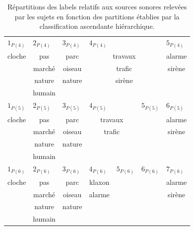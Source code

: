 \begin{table}[t]
\begin{tabular}{c|c|c|c|c|c|c}
\hline
\multicolumn{1}{l|}{$1_{P(4)}$} & \multicolumn{1}{l|}{$2_{P(4)}$} & \multicolumn{1}{l|}{$3_{P(4)}$}  & \multicolumn{3}{l|}{$4_{P(4)}$} & \multicolumn{1}{l}{$5_{P(4)}$} \\
cloche         & pas      & parc    & \multicolumn{3}{c|}{travaux} & alarme\\
               & marché   & oiseau  & \multicolumn{3}{c|}{trafic}  & sirène\\
               & nature   & nature  & \multicolumn{3}{c|}{sirène}  & \\
               & humain   &         & \multicolumn{3}{c|}{}        & \\
\hline
\multicolumn{1}{l|}{$1_{P(5)}$} & \multicolumn{1}{l|}{$2_{P(5)}$} & \multicolumn{1}{l|}{$3_{P(5)}$}  & \multicolumn{2}{l|}{$4_{P(5)}$} & \multicolumn{1}{l|}{$5_{P(5)}$} & \multicolumn{1}{l}{$6_{P(5)}$}\\ 
cloche          & pas      & parc    & \multicolumn{2}{c|}{travaux}     &     & alarme\\     
                & marché   & oiseau  & \multicolumn{2}{c|}{trafic}      &     & sirène\\  
                & nature   & nature  & \multicolumn{2}{c|}{}            &     &  \\  
                & humain   &         & \multicolumn{2}{c|}{}            &     &  \\                  
\hline
\multicolumn{1}{l|}{$1_{P(6)}$} & \multicolumn{1}{l|}{$2_{P(6)}$} & \multicolumn{1}{l|}{$3_{P(6)}$}  & \multicolumn{1}{l|}{$4_{P(6)}$} & \multicolumn{1}{l|}{$5_{P(6)}$} & \multicolumn{1}{l|}{$6_{P(6)}$} & \multicolumn{1}{l}{$7_{P(6)}$} \\  
cloche          & pas         & parc    & klaxon     &      &     & alarme \\        
                & marché      & oiseau  & alarme     &      &     & sirène \\  
                & nature      & nature  &            &      &     & \\  
                & humain      &         &            &      &     & \\  
\hline
\end{tabular}
\vspace{0.5mm}
\caption{Répartitions des labels relatifs aux sources sonores relevées par les sujets en fonction des partitions établies par la classification ascendante hiérarchique.}
\label{tab:markerHacSource}
\end{table}


